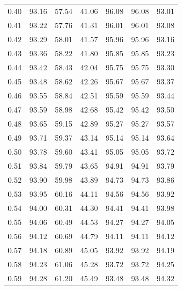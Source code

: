 \begin{tabular}{|c|c|c|c|c|c|c|}
      0.40 &     93.16 &     57.54 &      41.06 &   96.08 &      96.08 &         93.01 \\
      0.41 &     93.22 &     57.76 &      41.31 &   96.01 &      96.01 &         93.08 \\
      0.42 &     93.29 &     58.01 &      41.57 &   95.96 &      95.96 &         93.16 \\
      0.43 &     93.36 &     58.22 &      41.80 &   95.85 &      95.85 &         93.23 \\
      0.44 &     93.42 &     58.43 &      42.04 &   95.75 &      95.75 &         93.30 \\
      0.45 &     93.48 &     58.62 &      42.26 &   95.67 &      95.67 &         93.37 \\
      0.46 &     93.55 &     58.84 &      42.51 &   95.59 &      95.59 &         93.44 \\
      0.47 &     93.59 &     58.98 &      42.68 &   95.42 &      95.42 &         93.50 \\
      0.48 &     93.65 &     59.15 &      42.89 &   95.27 &      95.27 &         93.57 \\
      0.49 &     93.71 &     59.37 &      43.14 &   95.14 &      95.14 &         93.64 \\
      0.50 &     93.78 &     59.60 &      43.41 &   95.05 &      95.05 &         93.72 \\
      0.51 &     93.84 &     59.79 &      43.65 &   94.91 &      94.91 &         93.79 \\
      0.52 &     93.90 &     59.98 &      43.89 &   94.73 &      94.73 &         93.86 \\
      0.53 &     93.95 &     60.16 &      44.11 &   94.56 &      94.56 &         93.92 \\
      0.54 &     94.00 &     60.31 &      44.30 &   94.41 &      94.41 &         93.98 \\
      0.55 &     94.06 &     60.49 &      44.53 &   94.27 &      94.27 &         94.05 \\
      0.56 &     94.12 &     60.69 &      44.79 &   94.11 &      94.11 &         94.12 \\
      0.57 &     94.18 &     60.89 &      45.05 &   93.92 &      93.92 &         94.19 \\
      0.58 &     94.23 &     61.06 &      45.28 &   93.72 &      93.72 &         94.25 \\
      0.59 &     94.28 &     61.20 &      45.49 &   93.48 &      93.48 &         94.32 \\

\end{tabular}
